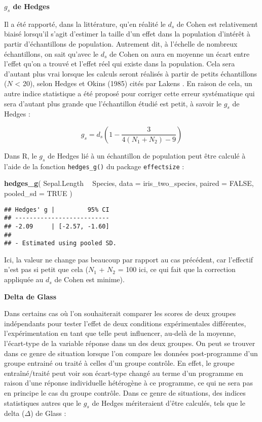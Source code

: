 \documentclass[
  french,
]{book}
\newenvironment{Shaded}{\begin{snugshade}}{\end{snugshade}}
\newcommand{\DataTypeTok}[1]{\textcolor[rgb]{0.13,0.29,0.53}{#1}}
\newcommand{\KeywordTok}[1]{\textcolor[rgb]{0.13,0.29,0.53}{\textbf{#1}}}
\newcommand{\NormalTok}[1]{#1}
\newcommand{\OperatorTok}[1]{\textcolor[rgb]{0.81,0.36,0.00}{\textbf{#1}}}
\newcommand{\OtherTok}[1]{\textcolor[rgb]{0.56,0.35,0.01}{#1}}
\newcommand{\StringTok}[1]{\textcolor[rgb]{0.31,0.60,0.02}{#1}}
\begin{document}
\textbf{\(g_{s}\) de Hedges}

Il a été rapporté, dans la littérature, qu'en réalité le \(d_{s}\) de Cohen est relativement biaisé lorsqu'il s'agit d'estimer la taille d'un effet dans la population d'intérêt à partir d'échantillons de population. Autrement dit, à l'échelle de nombreux échantillons, on sait qu'avec le \(d_{s}\) de Cohen on aura en moyenne un écart entre l'effet qu'on a trouvé et l'effet réel qui existe dans la population. Cela sera d'autant plus vrai lorsque les calculs seront réalisés à partir de petits échantillons (\(N\) \textless{} 20), selon Hedges et Okins (1985) cités par Lakens \autocite*{lakensCalculatingReportingEffect2013}. En raison de cela, un autre indice statistique a été proposé pour corriger cette erreur systématique qui sera d'autant plus grande que l'échantillon étudié est petit, à savoir le \(g_{s}\) de Hedges :

\[g_{s} = d_{s} (1 - \frac{3}{4(N_{1} + N_{2}) - 9})\]

Dans R, le \(g_{s}\) de Hedges lié à un échantillon de population peut être calculé à l'aide de la fonction \texttt{hedges\_g()} du package \texttt{effectsize} :

\begin{Shaded}
\begin{Highlighting}[]
\KeywordTok{hedges_g}\NormalTok{(}
\NormalTok{  Sepal.Length }\OperatorTok{~}\StringTok{ }\NormalTok{Species,}
  \DataTypeTok{data =}\NormalTok{ iris_two_species, }
  \DataTypeTok{paired =} \OtherTok{FALSE}\NormalTok{, }
  \DataTypeTok{pooled_sd =} \OtherTok{TRUE}
\NormalTok{  )}
\end{Highlighting}
\end{Shaded}

\begin{verbatim}
## Hedges' g |         95% CI
## --------------------------
## -2.09     | [-2.57, -1.60]
## 
## - Estimated using pooled SD.
\end{verbatim}

Ici, la valeur ne change pas beaucoup par rapport au cas précédent, car l'effectif n'est pas si petit que cela (\(N_{1}\) + \(N_{2}\) = 100 ici, ce qui fait que la correction appliquée au \(d_{s}\) de Cohen est minime).

\textbf{Delta de Glass}

Dans certains cas où l'on souhaiterait comparer les scores de deux groupes indépendants pour tester l'effet de deux conditions expérimentales différentes, l'expérimentation en tant que telle peut influencer, au-delà de la moyenne, l'écart-type de la variable réponse dans un des deux groupes. On peut se trouver dans ce genre de situation lorsque l'on compare les données post-programme d'un groupe entrainé ou traité à celles d'un groupe contrôle. En effet, le groupe entraîné/traité peut voir son écart-type changé au terme d'un programme en raison d'une réponse individuelle hétérogène à ce programme, ce qui ne sera pas en principe le cas du groupe contrôle. Dans ce genre de situations, des indices statistiques autres que le \(g_{s}\) de Hedges mériteraient d'être calculés, tels que le delta (\(\Delta\)) de Glass \autocite{lakensCalculatingReportingEffect2013} :
\end{document}
